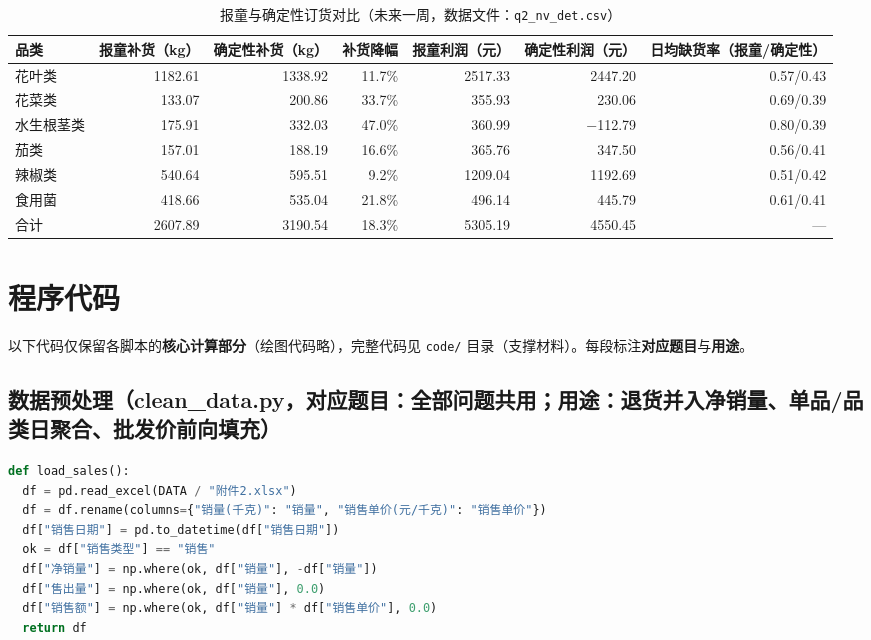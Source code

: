 \begin{appendices}
\begin{table}[H]
\centering
\caption{报童与确定性订货对比（未来一周，数据文件：\texttt{q2\_nv\_det.csv}）}
\label{tab:nv_det}
\begin{tabular}{l r r r r r r}
\toprule
品类 & 报童补货（kg） & 确定性补货（kg） & 补货降幅 & 报童利润（元） & 确定性利润（元） & 日均缺货率（报童/确定性） \\
\midrule
花叶类 & 1182.61 & 1338.92 & 11.7\% & 2517.33 & 2447.20 & 0.57/0.43 \\
花菜类 & 133.07 & 200.86 & 33.7\% & 355.93 & 230.06 & 0.69/0.39 \\
水生根茎类 & 175.91 & 332.03 & 47.0\% & 360.99 & −112.79 & 0.80/0.39 \\
茄类 & 157.01 & 188.19 & 16.6\% & 365.76 & 347.50 & 0.56/0.41 \\
辣椒类 & 540.64 & 595.51 & 9.2\% & 1209.04 & 1192.69 & 0.51/0.42 \\
食用菌 & 418.66 & 535.04 & 21.8\% & 496.14 & 445.79 & 0.61/0.41 \\
合计 & 2607.89 & 3190.54 & 18.3\% & 5305.19 & 4550.45 & --- \\
\bottomrule
\end{tabular}
\end{table}


\section{程序代码}

以下代码仅保留各脚本的\textbf{核心计算部分}（绘图代码略），完整代码见
\texttt{code/} 目录（支撑材料）。每段标注\textbf{对应题目}与\textbf{用途}。

\subsection{数据预处理（clean\_data.py，对应题目：全部问题共用；用途：退货并入净销量、单品/品类日聚合、批发价前向填充）}
\label{clean_data}

\begin{lstlisting}[language=Python, basicstyle=\small\ttfamily, breaklines=true]
def load_sales():
  df = pd.read_excel(DATA / "附件2.xlsx")
  df = df.rename(columns={"销量(千克)": "销量", "销售单价(元/千克)": "销售单价"})
  df["销售日期"] = pd.to_datetime(df["销售日期"])
  ok = df["销售类型"] == "销售"
  df["净销量"] = np.where(ok, df["销量"], -df["销量"])
  df["售出量"] = np.where(ok, df["销量"], 0.0)
  df["销售额"] = np.where(ok, df["销量"] * df["销售单价"], 0.0)
  return df


\end{lstlisting}
\end{appendices}
